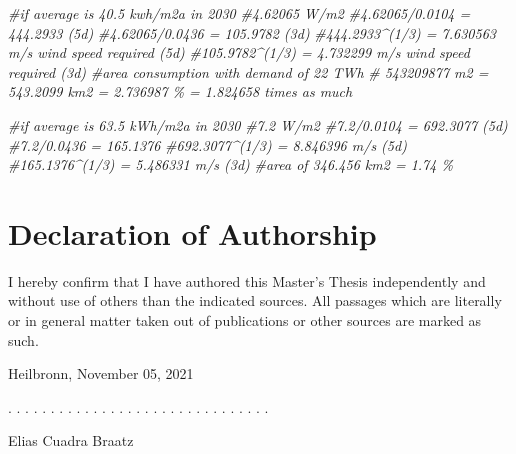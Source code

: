 \documentclass[a4paper,11pt]{article}
\newcommand{\thesistype}{Master's Thesis}
\newcommand{\thesisauthor}{Elias Cuadra Braatz}
\newcommand{\thesisdate}{November 05, 2021}
\newenvironment{Shaded}{\begin{snugshade}}{\end{snugshade}}
\newcommand{\CommentTok}[1]{\textcolor[rgb]{0.56,0.35,0.01}{\textit{#1}}}
\begin{document}
\begin{Shaded}
\begin{Highlighting}[]
\CommentTok{\#if average is 40.5 kwh/m2a in 2030}
\CommentTok{\#4.62065 W/m2}
\CommentTok{\#4.62065/0.0104 = 444.2933 (5d)}
\CommentTok{\#4.62065/0.0436 = 105.9782 (3d)}
\CommentTok{\#444.2933\^{}(1/3) = 7.630563 m/s wind speed required (5d)}
\CommentTok{\#105.9782\^{}(1/3) = 4.732299 m/s wind speed required (3d)}
\CommentTok{\#area consumption with demand of 22 TWh}
\CommentTok{\# 543209877 m2 = 543.2099 km2 = 2.736987 \% = 1.824658 times as much}

\CommentTok{\#if average is 63.5 kWh/m2a in 2030}
\CommentTok{\#7.2 W/m2}
\CommentTok{\#7.2/0.0104 = 692.3077 (5d)}
\CommentTok{\#7.2/0.0436 = 165.1376}
\CommentTok{\#692.3077\^{}(1/3) = 8.846396 m/s (5d)}
\CommentTok{\#165.1376\^{}(1/3) = 5.486331 m/s (3d)}
\CommentTok{\#area of 346.456 km2 = 1.74 \%}
\end{Highlighting}
\end{Shaded}





\newpage
\thispagestyle{empty}
\hypertarget{declaration-of-authorship}{%
\section*{Declaration of Authorship}\label{declaration-of-authorship}}

I hereby confirm that I have authored this \thesistype{} independently and
without use of others than the indicated sources. All passages which are
literally or in general matter taken out of publications or other sources are
marked as such.
\vspace{1cm}

Heilbronn, \thesisdate{}
\vspace{3cm}

. . . . . . . . . . . . . . . . . . . . . . . . . . . . . . .
\vspace{0.1cm}

\thesisauthor{}
\end{document}
